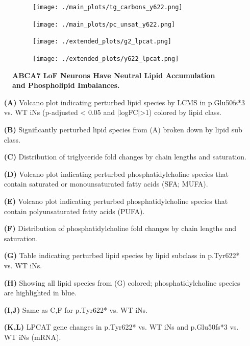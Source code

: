 \begin{figure}[H]
\begin{subfigure}[t]{.35\textwidth}
        \caption{}
        \texttt{[image: ./main\_plots/tg\_carbons\_y622.png]}        
    \end{subfigure} 
    \begin{subfigure}[t]{.35\textwidth}
        \caption{}
        \texttt{[image: ./main\_plots/pc\_unsat\_y622.png]}        
    \end{subfigure} 
    \begin{subfigure}[t]{.2\textwidth}
        \caption{}
        \texttt{[image: ./extended\_plots/g2\_lpcat.png]}        
    \end{subfigure} 
    \begin{subfigure}[t]{.2\textwidth}
        \caption{}
        \texttt{[image: ./extended\_plots/y622\_lpcat.png]}        
    \end{subfigure} 
    \caption{
        \textbf{ABCA7 LoF Neurons Have Neutral Lipid Accumulation and Phospholipid Imbalances.}\\
    }
    \label{fig:main_lipids}
\end{figure}
\begin{itemize}
    \item[\textbf{(A)}] Volcano plot indicating perturbed lipid species by LCMS in p.Glu50fs*3 vs. WT iNs (p-adjusted < 0.05 and |logFC|>1) colored by lipid class.
    \item[\textbf{(B)}] Significantly perturbed lipid species from (A) broken down by lipid sub class.
    \item[\textbf{(C)}] Distribution of triglyceride fold changes by chain lengths and saturation.
    \item[\textbf{(D)}] Volcano plot indicating perturbed phosphatidylcholine species that contain saturated or monounsaturated fatty acids (SFA; MUFA). 
    \item[\textbf{(E)}] Volcano plot indicating perturbed phosphatidylcholine species that contain polyunsaturated fatty acids (PUFA).
    \item[\textbf{(F)}] Distribution of phosphatidylcholine fold changes by chain lengths and saturation. 
    \item[\textbf{(G)}] Table indicating perturbed lipid species by lipid subclass in p.Tyr622* vs. WT iNs.
    \item[\textbf{(H)}] Showing all lipid species from (G) colored; phosphatidylcholine species are highlighted in blue.
    \item[\textbf{(I,J)}] Same as C,F for p.Tyr622* vs. WT iNs.
    \item[\textbf{(K,L)}] LPCAT gene changes in p.Tyr622* vs. WT iNs and p.Glu50fs*3 vs. WT iNs (mRNA).
\end{itemize}